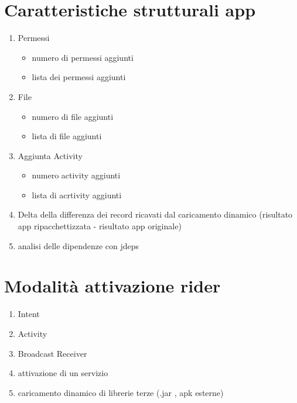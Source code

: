 

\section*{Caratteristiche strutturali app}
\begin{enumerate}
	\item Permessi
	\begin{itemize}
		\item numero di permessi aggiunti
		\item lista dei permessi aggiunti
	\end{itemize}
	\item File
	\begin{itemize}
		\item numero di file aggiunti
		\item lista di file aggiunti
	\end{itemize}
\item Aggiunta Activity
\begin{itemize}
	\item numero activity aggiunti
	\item lista di acrtivity aggiunti
\end{itemize}
\item Delta della differenza dei record ricavati dal caricamento dinamico (risultato app ripacchettizzata - risultato app originale)
\item analisi delle dipendenze con jdeps
\end{enumerate}

\section*{Modalità attivazione rider}
\begin{enumerate}
	\item Intent
	\item Activity
	\item Broadcast Receiver
	\item attivazione di un servizio
	\item caricamento dinamico di librerie terze (.jar , apk esterne)
	
\end{enumerate}
